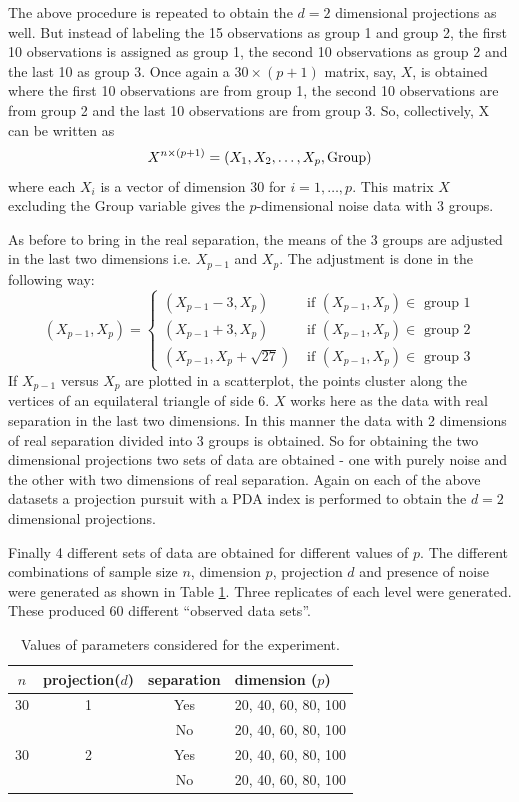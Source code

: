 \documentclass[12]{article}
\begin{document}
The above procedure is repeated to obtain the $d = 2$ dimensional projections as well. But instead of labeling the 15 observations as group 1 and group 2, the first 10 observations is assigned as group 1, the second 10 observations as group 2 and the last 10 as group 3. Once again a $30 \times (p + 1)$ matrix, say, $X$, is obtained where the first 10 observations are from group 1, the second 10 observations are from group 2 and the last 10 observations are from group 3.  So, collectively, X can be written as
$$X^{n \times (p + 1)} = (X_1, X_2, \dots, X_p, \hbox{Group})$$ where each $X_i$ is a vector of dimension 30 for $i = 1, \dots, p$. This matrix $X$ excluding the Group variable gives the $p$-dimensional noise data with 3 groups.

As before to bring in the real separation, the means of the 3 groups are adjusted in the last two dimensions i.e. $X_{p-1}$ and $X_p$. The adjustment is done in the following way:
$$
(X_{p-1}, X_p) = \left\{ \begin{array}{rl}
 (X_{p-1} - 3, X_p) &\mbox{ if $(X_{p-1}, X_p) \in$ group 1} \\
 (X_{p-1} + 3, X_p) &\mbox{ if $(X_{p-1}, X_p) \in$ group 2} \\
 (X_{p-1} , X_p + \sqrt{27}) &\mbox{ if $(X_{p-1}, X_p) \in$ group 3}
       \end{array} \right.
$$
If $X_{p-1}$ versus $X_p$ are plotted in a scatterplot, the points cluster along the vertices of an equilateral triangle of side 6. $X$ works here as the data with real separation in the last two dimensions. In this manner the data with 2 dimensions of real separation divided into 3 groups is obtained. 
So for obtaining the two dimensional projections two sets of data are obtained - one with purely noise and the other with two dimensions of real separation. Again on each of the above datasets a projection pursuit with a PDA index is performed to obtain the $d = 2$ dimensional projections. 

Finally 4 different sets of data are obtained for different values of $p$. The different combinations of sample size $n$, dimension $p$, projection $d$ and presence of noise were generated as shown in Table \ref{freq}. Three replicates of each level were generated. These produced 60 different ``observed data sets''. 

\begin{table}[htbp]
\begin{center}
\caption{Values of parameters considered for the experiment.}
\begin{tabular}{cccp{3cm}}
  \hline
  \hline
  $n$ & projection($d$) & separation & dimension ($p$) \\
  \hline
  30 & 1 & Yes & 20, 40, 60, 80, 100 \\
      & & No & 20, 40, 60, 80, 100\\
   30 & 2 & Yes & 20, 40, 60, 80, 100 \\
     & & No & 20, 40, 60, 80, 100\\   
      \hline
\end{tabular}
\label{freq}
\end{center}
\end{table}
\end{document}
